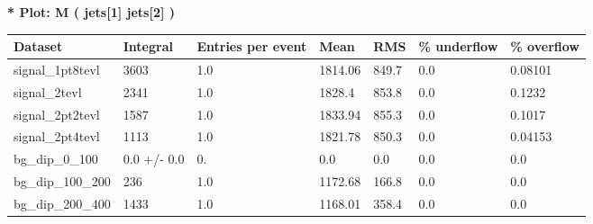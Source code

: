 \documentclass[a4paper, 10pt]{article}
\begin{document}
\textbf{* Plot: M ( jets[1] jets[2] ) }\\
   \begin{table}[H]
  \begin{center}
    \begin{tabular}{|m{23.0mm}|m{23.0mm}|m{18.0mm}|m{19.0mm}|m{19.0mm}|m{19.0mm}|m{19.0mm}|}
      \hline
      {\cellcolor{yellow}         Dataset}& {\cellcolor{yellow}         Integral}& {\cellcolor{yellow}         Entries per event}& {\cellcolor{yellow}         Mean}& {\cellcolor{yellow}         RMS}& {\cellcolor{yellow}         \% underflow}& {\cellcolor{yellow}         \% overflow}\\
      \hline
      {\cellcolor{white}         signal\_1pt8tevl}& {\cellcolor{white}         3603}& {\cellcolor{white}         1.0}& {\cellcolor{white}         1814.06}& {\cellcolor{white}         849.7}& {\cellcolor{green}         0.0}& {\cellcolor{green}         0.08101}\\
      \hline
      {\cellcolor{white}         signal\_2tevl}& {\cellcolor{white}         2341}& {\cellcolor{white}         1.0}& {\cellcolor{white}         1828.4}& {\cellcolor{white}         853.8}& {\cellcolor{green}         0.0}& {\cellcolor{green}         0.1232}\\
      \hline
      {\cellcolor{white}         signal\_2pt2tevl}& {\cellcolor{white}         1587}& {\cellcolor{white}         1.0}& {\cellcolor{white}         1833.94}& {\cellcolor{white}         855.3}& {\cellcolor{green}         0.0}& {\cellcolor{green}         0.1017}\\
      \hline
      {\cellcolor{white}         signal\_2pt4tevl}& {\cellcolor{white}         1113}& {\cellcolor{white}         1.0}& {\cellcolor{white}         1821.78}& {\cellcolor{white}         850.3}& {\cellcolor{green}         0.0}& {\cellcolor{green}         0.04153}\\
      \hline
      {\cellcolor{white}         bg\_dip\_0\_100}& {\cellcolor{white}         0.0 +/\-- 0.0}& {\cellcolor{white}         0.}& {\cellcolor{white}         0.0}& {\cellcolor{white}         0.0}& {\cellcolor{green}         0.0}& {\cellcolor{green}         0.0}\\
      \hline
      {\cellcolor{white}         bg\_dip\_100\_200}& {\cellcolor{white}         236}& {\cellcolor{white}         1.0}& {\cellcolor{white}         1172.68}& {\cellcolor{white}         166.8}& {\cellcolor{green}         0.0}& {\cellcolor{green}         0.0}\\
      \hline
      {\cellcolor{white}         bg\_dip\_200\_400}& {\cellcolor{white}         1433}& {\cellcolor{white}         1.0}& {\cellcolor{white}         1168.01}& {\cellcolor{white}         358.4}& {\cellcolor{green}         0.0}& {\cellcolor{green}         0.0}\\

\end{tabular}
\end{center}
\end{table}
\end{document}
